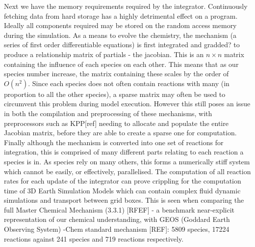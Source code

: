 Next we have the memory requirements required by the integrator. Continuously fetching data from hard storage has a highly detrimental effect on a program. Ideally all components required may be stored on the random access memory during the simulation. As a means to evolve the chemistry, the mechanism (a series of first order differentiable equations) is first integrated and gradded? to produce a relationship matrix of partials - the jacobian. This is an $n \times n$ matrix containing the influence of each species on each other. This means that as our species number increase, the matrix containing these scales by the order of  $O(n^2)$. Since each species does not often contain reactions with many (in proportion to all the other species), a sparse matrix may often be used to circumvent this problem during model execution. However this still poses an issue in both the compilation and preprocessing of these mechanisms, with preprocessors such as KPP[ref] needing to allocate and populate the entire Jacobian matrix, before they are able to create a sparse one for computation. \\


Finally although the mechanism is converted into one set of reactions for integration, this is comprised of many different parts relating to each reaction a species is in. As species rely on many others, this forms a numerically stiff system which cannot be easily, or effectively, parallelised. The computation of all reaction rates for each update of the integrator can prove crippling for the computation time of 3D Earth Simulation Models which can contain complex fluid dynamic simulations and transport between grid boxes. This is seen when comparing the full Master Chemical Mechanism (3.3.1) [RFEF] - a benchmark near-explicit representation of our chemical understanding, with GEOS (Goddard Earth Observing System) -Chem  standard mechanism [REF]: 5809 species, 17224 reactions against 241 species and 719 reactions respectively. 
 
 